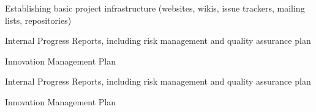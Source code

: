 \begin{workpackage}
\begin{wpdelivs}
\begin{wpdeliv}[due=1,id=tickets,dissem=PU,nature=DEC,lead=PS]{Establishing basic project infrastructure 
    (websites, wikis, issue trackers, mailing lists, repositories)}
\end{wpdeliv}

\begin{wpdeliv}[due=12,lead=PS,
id=ipr,dissem=CO,nature=R]{Internal Progress Reports, including risk management and quality assurance plan}
\end{wpdeliv}

\begin{wpdeliv}[due=18,lead=PS,
id=tickets,dissem=CO,nature=R]{Innovation Management Plan}
\end{wpdeliv}

\begin{wpdeliv}[due=36,lead=PS,
id=ipr2,dissem=CO,nature=R]{Internal Progress Reports, including risk management and quality assurance plan}
\end{wpdeliv}

\begin{wpdeliv}[due=45,lead=PS,
id=tickets,dissem=CO,nature=R]{Innovation Management Plan}
\end{wpdeliv}




\end{wpdelivs}
\end{workpackage}

